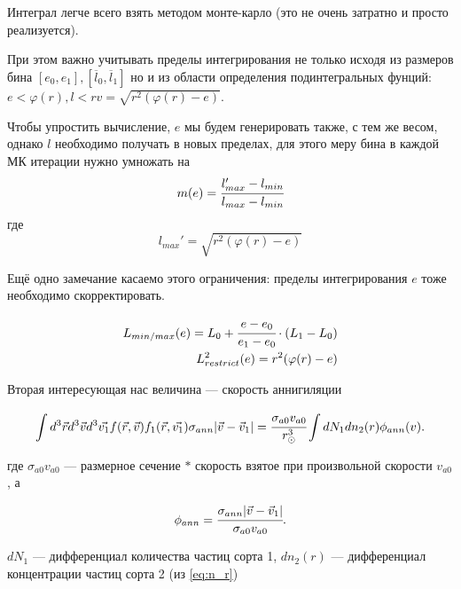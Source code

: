 \begin{enumerate}
	 		
	 	Интеграл легче всего взять методом монте-карло (это не очень затратно и просто реализуется).
	 	
	 	При этом важно учитывать пределы интегрирования не только исходя из размеров бина $[e_0,e_1],[\overline{l}_0,\overline{l}_1]$ но и из области определения подинтегральных фунций: $e<\varphi(r), l<rv = \sqrt{r^2(\varphi(r)-e)}$.
	 	
	 	Чтобы упростить вычисление, $e$ мы будем генерировать также, с тем же весом, однако $l$ необходимо получать в новых пределах, для этого меру бина в каждой МК итерации нужно умножать на 
	 	\begin{equation*}
	 		m(e) = \cfrac{l_{max}'-l_{min}}
	 		{l_{max}-l_{min}}
	 	\end{equation*}
	 	где 
	 	\begin{equation*}
	 		l_{max}' = \sqrt{r^2(\varphi(r)-e)}
	 	\end{equation*}
	 	
	 	Ещё одно замечание касаемо этого ограничения: пределы интегрирования $e$ тоже необходимо скорректировать.
	 	
	 	\begin{eqnarray}
	 		L_{min/max}(e) = L_0 + \cfrac{e-e_0}{e_1-e_0} \cdot (L_1-L_0)
	 		\\
	 		L^2_{restrict}(e) = r^2(\varphi(r)-e)	 		
	 	\end{eqnarray}
	 	
	 \end{enumerate}
	 
	 Вторая интересующая нас величина --- скорость аннигиляции
	 
	 \begin{equation}
	 	\label{eq:ann_st}
	 	\int{d^3\vec{r} d^3\vec{v}  d^3\vec{v_1} 
	 		f(\vec{r},\vec{v})f_1(\vec{r},\vec{v_1}) \sigma_{ann} 
	 		|\vec{v}-\vec{v}_1|} = \cfrac{\sigma_{a0}v_{a0}}{r_{\odot}^3} \int{dN_1 dn_2(r) \phi_{ann}(v) }.
	 \end{equation}
	 
	 где $\sigma_{a0}v_{a0}$ --- размерное сечение $*$ скорость взятое при произвольной скорости $v_{a0}$, а 
	 
	\begin{equation}
		\phi_{ann} = \cfrac{\sigma_{ann} |\vec{v}-\vec{v}_1| }{\sigma_{a0}  v_{a0}}.
	\end{equation}
	
	$dN_1$ --- дифференциал количества частиц сорта 1, $dn_2(r)$ --- дифференциал концентрации частиц сорта 2  (из \ref{eq:n_r})
	
